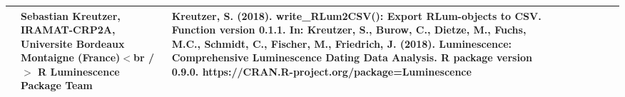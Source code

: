 \begin{table}[ht]
\begin{tabular}{rllllllll}
 & Sebastian Kreutzer, IRAMAT-CRP2A, Universite Bordeaux Montaigne (France)$<$br /$>$  R Luminescence Package Team & Kreutzer, S. (2018). write\_RLum2CSV(): Export RLum-objects to CSV. Function version 0.1.1. In: Kreutzer, S., Burow, C., Dietze, M., Fuchs, M.C., Schmidt, C., Fischer, M., Friedrich, J. (2018). Luminescence: Comprehensive Luminescence Dating Data Analysis. R package version 0.9.0. https://CRAN.R-project.org/package=Luminescence
 \\ 
   \hline
\end{tabular}
\end{table}

